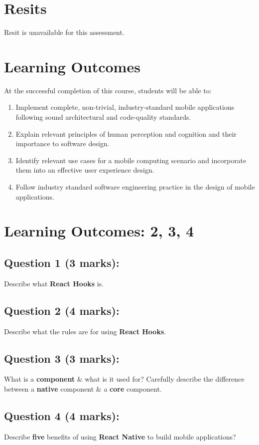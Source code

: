 \documentclass{article}
\begin{document}
\section*{Resits} 
Resit is unavailable for this assessment.

\section*{Learning Outcomes}
At the successful completion of this course, students will be able to:
\begin{enumerate}
	\item Implement complete, non-trivial, industry-standard mobile applications following sound architectural and code-quality standards.
	\item Explain relevant principles of human perception and cognition and their importance to software design.
	\item Identify relevant use cases for a mobile computing scenario and incorporate them into an effective user experience design.
	\item Follow industry standard software engineering practice in the design of mobile applications.
\end{enumerate}

\newpage

\section*{Learning Outcomes: 2, 3, 4}

\subsection*{Question 1 (3 marks):}
Describe what \textbf{React Hooks} is.

\subsection*{Question 2 (4 marks):}
Describe what the rules are for using \textbf{React Hooks}.

\subsection*{Question 3 (3 marks):}
What is a \textbf{component} \& what is it used for? Carefully describe the difference between a \textbf{native} component \& a \textbf{core} component.

\subsection*{Question 4 (4 marks):}
Describe \textbf{five} benefits of using \textbf{React Native} to build mobile applications?
\end{document}
